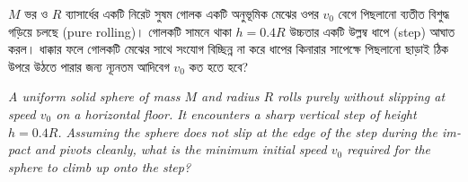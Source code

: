\documentclass[12pt, a4paper]{article}
\begin{document}
{{%
\begin{tcolorbox}[questionbox={প্রশ্ন (Question) 34}]
    \noindent
    $M$ ভর ও $R$ ব্যাসার্ধের একটি নিরেট সুষম গোলক একটি অনুভূমিক মেঝের ওপর $v_0$ বেগে পিছলানো ব্যতীত বিশুদ্ধ গড়িয়ে চলছে (pure rolling)। গোলকটি সামনে থাকা $h = 0.4R$ উচ্চতার একটি উল্লম্ব ধাপে (step) আঘাত করল। ধাক্কার ফলে গোলকটি মেঝের সাথে সংযোগ বিচ্ছিন্ন না করে ধাপের কিনারার সাপেক্ষে পিছলানো ছাড়াই ঠিক উপরে উঠতে পারার জন্য ন্যূনতম আদিবেগ $v_0$ কত হতে হবে?
    
    \vspace{0.8em}
    \begin{english}
    \noindent\textit{\color{darkgray}
    A uniform solid sphere of mass $M$ and radius $R$ rolls purely without slipping at speed $v_0$ on a horizontal floor. It encounters a sharp vertical step of height $h = 0.4R$. Assuming the sphere does not slip at the edge of the step during the impact and pivots cleanly, what is the minimum initial speed $v_0$ required for the sphere to climb up onto the step?
    }
    \end{english}
\end{tcolorbox}

\vspace{1em}
\begin{center}
\end{center}
\vspace{1em}

}}
\end{document}

